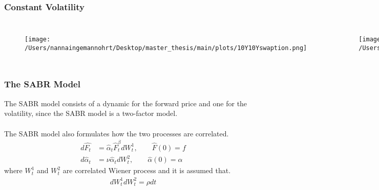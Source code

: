 \documentclass{beamer}
\begin{document}
\begin{frame}
    \frametitle{\textcolor{KUrod}{Constant Volatility}}
    \begin{columns}
        \begin{figure}
            \texttt{[image: /Users/nannaingemannohrt/Desktop/master\_thesis/main/plots/10Y10Yswaption.png]}
        \end{figure}
        
        \begin{figure}
            \texttt{[image: /Users/nannaingemannohrt/Desktop/master\_thesis/main/plots/10Y10Yswaptionreturn.png]}
        \end{figure}

        \begin{figure}
            \texttt{[image: /Users/nannaingemannohrt/Desktop/master\_thesis/main/plots/sp500.png]}
        \end{figure}
        
        \begin{figure}
            \texttt{[image: /Users/nannaingemannohrt/Desktop/master\_thesis/main/plots/sp500return.png]}
        \end{figure}
    \end{columns}

\end{frame}

\begin{frame}
    \frametitle{\textcolor{KUrod}{The SABR Model}}
    The SABR model consists of a dynamic for the forward price
    and one for the volatility, since the SABR model is a 
    two-factor model. 
    \\\\
    The SABR model also formulates 
    how the two processes are correlated. 
    \begin{align}
        d \hat{F_t} &= 
        \hat{\alpha}_t \hat{F}_t^\beta dW_t^1, \quad \quad \hat{F}(0)=f   \label{f_dyn}\\
        d\hat{\alpha}_t &= \nu \hat{\alpha}_t dW_t^2, \quad \quad \hat{\alpha}(0)=\alpha \label{sigma_dyn}
    \end{align}
    where $W_t^{1}$ and $W_t^{2}$ are correlated Wiener 
    process and it is assumed that.
    \begin{align}
        dW_t^{1}dW_t^{2}=\rho dt
    \end{align}
\end{frame}
\end{document}
